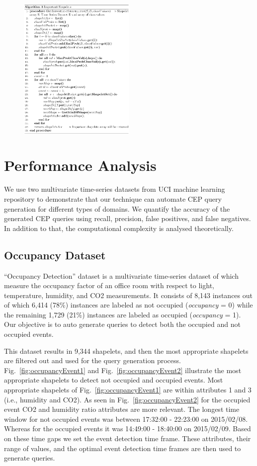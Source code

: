 \documentclass[conference]{IEEEtran}  %
\begin{document}
\begin{figure}
\includegraphics[width=0.5\textwidth]{algo3.png}\squeezeup\squeezeup\squeezeup
\end{figure}

\section{Performance Analysis}
We use two multivariate time-series datasets from UCI machine learning repository \cite{IEEEexample:Ocupancy,IEEEexample:EEG} to demonstrate that our technique can automate CEP query generation for different types of domains. We quantify the accuracy of the generated CEP queries using recall, precision, false positives, and false negatives. In addition to that, the computational complexity is analysed theoretically.

\subsection{Occupancy Dataset} 
“Occupancy Detection” dataset \cite{IEEEexample:Ocupancy} is a multivariate time-series dataset of which measure the occupancy factor of an office room with respect to light, temperature, humidity, and CO2 measurements. It consists of 8,143 instances out of which 6,414 (78\%) instances are labeled as not occupied (\textit{occupancy} = 0) while the remaining 1,729 (21\%) instances are labeled as occupied (\textit{occupancy} = 1). Our objective is to auto generate queries to detect both the occupied and not occupied events.

This dataset results in 9,344 shapelets, and then the most appropriate shapelets are filtered out and used for the query generation process. Fig.~\ref{fig:occupancyEvent1} and Fig.~\ref{fig:occupancyEvent2} illustrate the most appropriate shapelets to detect not occupied and occupied events. Most appropriate shapelets of Fig.~\ref{fig:occupancyEvent1} are within attributes 1 and 3 (i.e., humidity and CO2). As seen in Fig.~\ref{fig:occupancyEvent2} for the occupied event CO2 and humidity ratio attributes are more relevant. The longest time window for not occupied events was between 17:32:00 - 22:23:00 on 2015/02/08. Whereas for the occupied events it was 14:49:00 - 18:40:00 on 2015/02/09. Based on these time gaps we set the event detection time frame. These attributes, their range of values, and the optimal event detection time frames are then used to generate queries.
\end{document}
